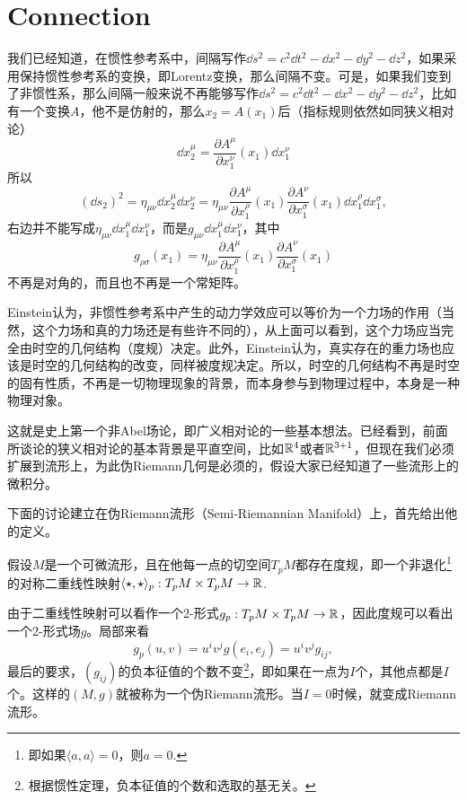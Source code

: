 \chapter{Connection}
\newcommand{\gl}{\mathfrak{gl}}

我们已经知道，在惯性参考系中，间隔写作$\dd s^2=c^2 \dd t^2-\dd x^2-\dd y^2-\dd z^2$，如果采用保持惯性参考系的变换，即Lorentz变换，那么间隔不变。可是，如果我们变到了非惯性系，那么间隔一般来说不再能够写作$\dd s^2=c^2 \dd t^2-\dd x^2-\dd y^2-\dd z^2$，比如有一个变换$A$，他不是仿射的，那么$x_2=A(x_1)$后（指标规则依然如同狭义相对论）
\[
	\dd x_2^\mu=\frac{\partial A^\mu}{\partial x_1^\nu}(x_1)\dd x_1^\nu
\]
所以
\[
	(\dd s_2)^2=\eta_{\mu\nu}\dd x_2^\mu\dd x_2^\nu=\eta_{\mu\nu}\frac{\partial A^\mu}{\partial x_1^\rho}(x_1)\frac{\partial A^\nu}{\partial x_1^\sigma}(x_1)\dd x_1^\rho\dd x_1^\sigma,
\]
右边并不能写成$\eta_{\mu\nu}\dd x_1^\mu\dd x_1^\nu$，而是$g_{\mu\nu}\dd x_1^\mu\dd x_1^\nu$，其中
\[
	g_{\rho\sigma}(x_1)=\eta_{\mu\nu}\frac{\partial A^\mu}{\partial x_1^\rho}(x_1)\frac{\partial A^\nu}{\partial x_1^\sigma}(x_1)
\]
不再是对角的，而且也不再是一个常矩阵。

Einstein认为，非惯性参考系中产生的动力学效应可以等价为一个力场的作用（当然，这个力场和真的力场还是有些许不同的），从上面可以看到，这个力场应当完全由时空的几何结构（度规）决定。此外，Einstein认为，真实存在的重力场也应该是时空的几何结构的改变，同样被度规决定。所以，时空的几何结构不再是时空的固有性质，不再是一切物理现象的背景，而本身参与到物理过程中，本身是一种物理对象。

这就是史上第一个非Abel场论，即广义相对论的一些基本想法。已经看到，前面所谈论的狭义相对论的基本背景是平直空间，比如$\mathbb{R}^4$或者$\mathbb{R}^{3+1}$，但现在我们必须扩展到流形上，为此伪Riemann几何是必须的，假设大家已经知道了一些流形上的微积分。

下面的讨论建立在伪Riemann流形（Semi-Riemannian Manifold）上，首先给出他的定义。

\para 假设$M$是一个可微流形，且在他每一点的切空间$T_pM$都存在度规，即一个非退化\footnote{即如果$\langle a,a\rangle=0$，则$a=0$.}的对称二重线性映射$\langle\star,\star\rangle_p:T_pM\times T_pM\to \mathbb{R}$.

由于二重线性映射可以看作一个2-形式$g_p:T_pM\times T_pM\to \mathbb{R}$，因此度规可以看出一个2-形式场$g$。局部来看
\[
	g_p(u,v)=u^iv^jg(e_i,e_j)=u^iv^jg_{ij},
\]
最后的要求，$(g_{ij})$的负本征值的个数不变\footnote{根据惯性定理，负本征值的个数和选取的基无关。}，即如果在一点为$I$个，其他点都是$I$个。这样的$(M,g)$就被称为一个伪Riemann流形。当$I=0$时候，就变成Riemann流形。

